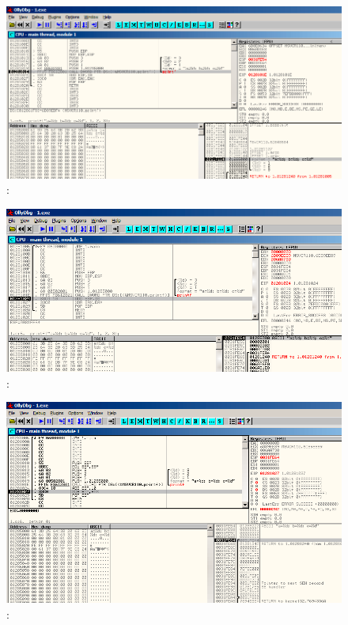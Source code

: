 \begin{figure}[H]
\centering
\includegraphics[scale=0.66]{patterns/03_printf/olly3_2.png}
\caption{\olly:  \printf{}}
\label{fig:printf3_olly_2}
\end{figure}

\begin{figure}[H]
\centering
\includegraphics[scale=0.66]{patterns/03_printf/olly3_3.png}
\caption{\olly:  \printf{}}
\label{fig:printf3_olly_3}
\end{figure}

\begin{figure}[H]
\centering
\includegraphics[scale=0.66]{patterns/03_printf/olly3_4.png}
\caption{\olly:  }
\label{fig:printf3_olly_4}
\end{figure}

